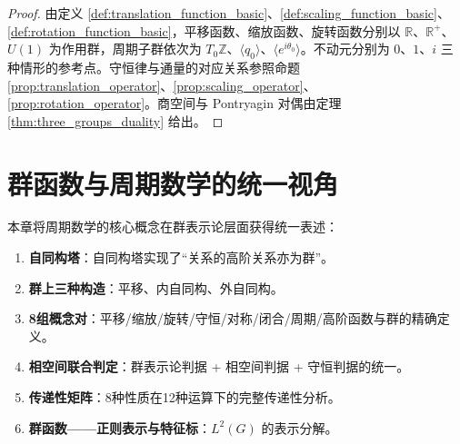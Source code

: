 \begin{proof}
由定义 \ref{def:translation_function_basic}、\ref{def:scaling_function_basic}、\ref{def:rotation_function_basic}，平移函数、缩放函数、旋转函数分别以 $\mathbb{R}$、$\mathbb{R}^+$、$U(1)$ 为作用群，周期子群依次为 $T_0\mathbb{Z}$、$\langle q_0\rangle$、$\langle e^{i\theta_0}\rangle$。不动元分别为 $0$、$1$、$i$ 三种情形的参考点。守恒律与通量的对应关系参照命题 \ref{prop:translation_operator}、\ref{prop:scaling_operator}、\ref{prop:rotation_operator}。商空间与 Pontryagin 对偶由定理 \ref{thm:three_groups_duality} 给出。
\end{proof}

\section{\texorpdfstring{群函数与周期数学的统一视角}{群函数与周期数学的统一视角}}

\begin{remark}[群函数在周期数学中的地位]\label{rem:group_function_hub}
本章将周期数学的核心概念在群表示论层面获得统一表述：
\begin{enumerate}[label=(\roman*)]
    \item \textbf{自同构塔}：自同构塔实现了“关系的高阶关系亦为群”。
    \item \textbf{群上三种构造}：平移、内自同构、外自同构。
    \item \textbf{8组概念对}：平移/缩放/旋转/守恒/对称/闭合/周期/高阶函数与群的精确定义。
    \item \textbf{相空间联合判定}：群表示论判据 + 相空间判据 + 守恒判据的统一。
    \item \textbf{传递性矩阵}：8种性质在12种运算下的完整传递性分析。
    \item \textbf{群函数——正则表示与特征标}：$L^2(G)$ 的表示分解。
\end{enumerate}
\end{remark}

